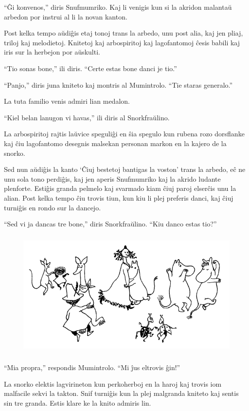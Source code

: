 ``Ĝi konvenos,'' diris Snufmumriko. Kaj li venigis kun si la akridon malantaŭ arbedon por instrui al li la novan kanton.

Post kelka tempo aŭdiĝis etaj tonoj trans la arbedo, unu post alia, kaj jen pliaj, triloj kaj melodietoj. Knitetoj kaj arbospiritoj kaj lagofantomoj ĉesis babili kaj iris sur la herbejon por aŭskulti.

``Tio sonas bone,'' ili diris. ``Certe estas bone danci je tio.''

``Panjo,'' diris juna kniteto kaj montris al Mumintrolo. ``Tie staras generalo.''

La tuta familio venis admiri lian medalon.

``Kiel belan lanugon vi havas,'' ili diris al Snorkfraŭlino.

La arbospiritoj rajtis laŭvice speguliĝi en ŝia spegulo kun rubena rozo dorsflanke kaj ĉiu lagofantomo desegnis malsekan personan markon en la kajero de la snorko.

Sed nun aŭdiĝis la kanto `Ĉiuj bestetoj bantigas la voston' trans la arbedo, eĉ ne unu sola tono perdiĝis, kaj jen aperis Snufmumriko kaj la akrido ludante plenforte. Estiĝis granda pelmelo kaj svarmado kiam ĉiuj paroj elserĉis unu la alian. Post kelka tempo ĉiu trovis tiun, kun kiu li plej preferis danci, kaj ĉiuj turniĝis en rondo sur la dancejo.

``Sed vi ja dancas tre bone,'' diris Snorkfraŭlino. ``Kiu danco estas tio?''

\begin{figure}[htbp]
\centering
\includegraphics[width=350pt,height=182pt]{6-7.png}
\caption{}
\label{6-7}
\end{figure}

``Mia propra,'' respondis Mumintrolo. ``Mi ĵus eltrovis ĝin!''

La snorko elektis lagvirineton kun perkoherboj en la haroj kaj trovis iom malfacile sekvi la takton. Snif turniĝis kun la plej malgranda kniteto kaj sentis sin tre granda. Estis klare ke la knito admiris lin.

